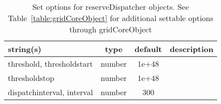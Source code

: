 \begin{table}[ht]
\centering
\begin{tabular}{p{5cm} c c p{7cm}}
\hline
string(s) & type & default & description \\
\hline
threshold, thresholdstart & number & 1e+48 & \\
thresholdstop & number & 1e+48 & \\
dispatchinterval, interval & number & 300 & \\
\hline
\end{tabular}
\caption{Set options for reserveDispatcher objects. See Table~\ref{table:gridCoreObject} for additional settable options through gridCoreObject}
\label{table:reserveDispatcher}
\end{table}
